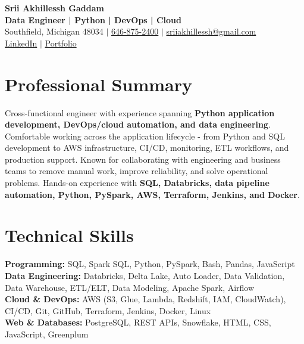 \documentclass[letterpaper,10pt]{article}
\begin{document}
\fontsize{9.35pt}{10.45pt}\selectfont

\begin{center}
    {\LARGE \textbf{Srii Akhillessh Gaddam}} \\[-1pt]
    \textbf{Data Engineer | Python | DevOps | Cloud} \\[2pt]
    Southfield, Michigan 48034 $|$
    \href{tel:6468752400}{646-875-2400} $|$
    \href{mailto:sriiakhillessh@gmail.com}{sriiakhillessh@gmail.com} \\[1pt]
    \href{https://www.linkedin.com/in/srii-akhiilessh-gaddam-b48668191/}{LinkedIn} $|$
    \href{https://sriiakhillesshg.github.io/portfolio/}{Portfolio}
\end{center}
\vspace{-8pt}

\section{Professional Summary}
\small{Cross-functional engineer with experience spanning \textbf{Python application development, DevOps/cloud automation, and data engineering}. Comfortable working across the application lifecycle - from Python and SQL development to AWS infrastructure, CI/CD, monitoring, ETL workflows, and production support. Known for collaborating with engineering and business teams to remove manual work, improve reliability, and solve operational problems. Hands-on experience with \textbf{SQL, Databricks, data pipeline automation, Python, PySpark, AWS, Terraform, Jenkins, and Docker}.}

\section{Technical Skills}
\small{
\textbf{Programming:} SQL, Spark SQL, Python, PySpark, Bash, Pandas, JavaScript \\
\textbf{Data Engineering:} Databricks, Delta Lake, Auto Loader, Data Validation, Data Warehouse, ETL/ELT, Data Modeling, Apache Spark, Airflow \\
\textbf{Cloud \& DevOps:} AWS (S3, Glue, Lambda, Redshift, IAM, CloudWatch), CI/CD, Git, GitHub, Terraform, Jenkins, Docker, Linux \\
\textbf{Web \& Databases:} PostgreSQL, REST APIs, Snowflake, HTML, CSS, JavaScript, Greenplum
}
\end{document}
